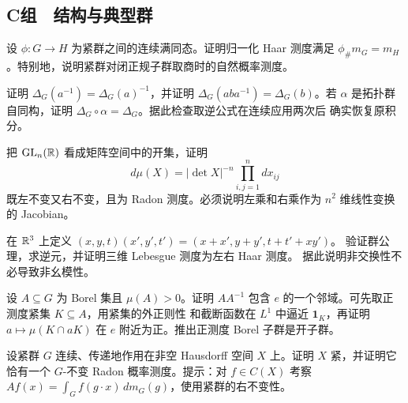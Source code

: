 \subsection*{C组　结构与典型群}
\begin{enumerate}[label=\textbf{\thechapter.\arabic*.},resume]
设 $\phi:G\to H$ 为紧群之间的连续满同态。证明归一化 Haar 测度满足
$\phi_\#m_G=m_H$。特别地，说明紧群对闭正规子群取商时的自然概率测度。

证明 $\Delta_G(a^{-1})=\Delta_G(a)^{-1}$，并证明
$\Delta_G(aba^{-1})=\Delta_G(b)$。若 $\alpha$ 是拓扑群自同构，证明
$\Delta_G\circ\alpha=\Delta_G$。据此检查取逆公式在连续应用两次后
确实恢复原积分。

把 $\mathrm{GL}_n(\mathbb{R})$ 看成矩阵空间中的开集，证明
\[
 d\mu(X)=|\det X|^{-n}\prod_{i,j=1}^n dx_{ij}
\]
既左不变又右不变，且为 Radon 测度。必须说明左乘和右乘作为
$n^2$ 维线性变换的 Jacobian。

在 $\mathbb{R}^3$ 上定义
$(x,y,t)(x',y',t')=(x+x',y+y',t+t'+xy')$。
验证群公理，求逆元，并证明三维 Lebesgue 测度为左右 Haar 测度。
据此说明非交换性不必导致非幺模性。

设 $A\subseteq G$ 为 Borel 集且 $\mu(A)>0$。证明 $AA^{-1}$ 包含
$e$ 的一个邻域。可先取正测度紧集 $K\subseteq A$，用紧集的外正则性
和截断函数在 $L^1$ 中逼近 $\mathbf1_K$，再证明
$a\mapsto\mu(K\cap aK)$ 在 $e$ 附近为正。推出正测度 Borel 子群是开子群。

设紧群 $G$ 连续、传递地作用在非空 Hausdorff 空间 $X$ 上。证明 $X$
紧，并证明它恰有一个 $G$-不变 Radon 概率测度。提示：对 $f\in C(X)$
考察 $A f(x)=\int_G f(g\cdot x)\,dm_G(g)$，使用紧群的右不变性。
\end{enumerate}
